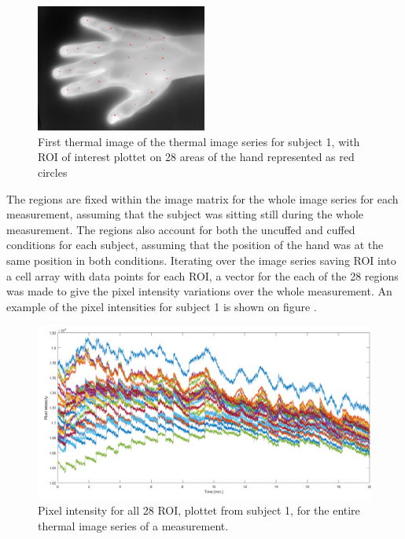 \begin{figure}[H]
	\includegraphics[width=0.5\textwidth]{figures/roiHand}  %
	\caption{First thermal image of the thermal image series for subject 1, with ROI of interest plottet on 28 areas of the hand represented as red circles}
	\label{fig:roiHand}  %
\end{figure}

The regions are fixed within the image matrix for the whole image series for each measurement, assuming that the subject was sitting still during the whole measurement. The regions also account for both the uncuffed and cuffed conditions for each subject, assuming that the position of the hand was at the same position in both conditions. 
Iterating over the image series saving ROI into a cell array with data points for each ROI, a vector for the each of the 28 regions was made to give the pixel intensity variations over the whole measurement. 
An example of the pixel intensities for subject 1 is shown on figure .

\begin{figure}[H]
	\includegraphics[width=1\textwidth]{figures/Intensities}  %
	\caption{Pixel intensity for all 28 ROI, plottet from subject 1, for the entire thermal image series of a measurement.}
	\label{fig:Intensities}  %
\end{figure}

